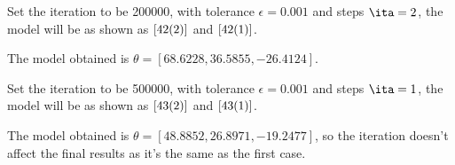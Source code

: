 \documentclass[a4paper,12pt]{article}
\begin{document}
Set the iteration to be 200000, with tolerance $\epsilon = 0.001$ and steps $\ita = 2$, the model will be as shown as $\ref{42(2)}$ and $\ref{42(1)}$.

The model obtained is $\theta = [ 68.6228, 36.5855, -26.4124]$.

\begin{figure}[h]
\setcounter{subfigure}{14}
\centering
{}
\end{figure}

Set the iteration to be 500000, with tolerance $\epsilon = 0.001$ and steps $\ita = 1$, the model will be as shown as $\ref{43(2)}$ and $\ref{43(1)}$.

The model obtained is $\theta = [48.8852, 26.8971, -19.2477]$, so the iteration doesn't affect the final results as it's the same as the first case.
\end{document}
